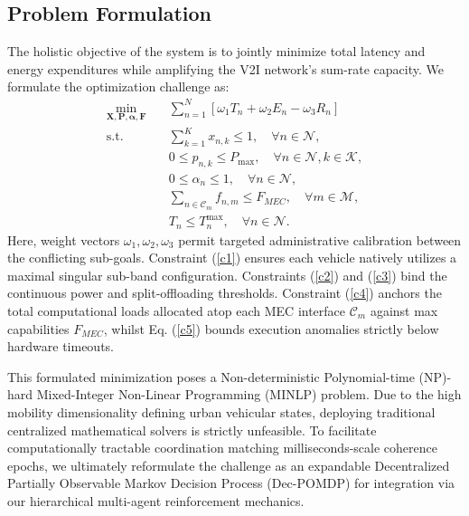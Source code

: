 \subsection{Problem Formulation}
The holistic objective of the system is to jointly minimize total latency and energy expenditures while amplifying the V2I network's sum-rate capacity. We formulate the optimization challenge as:
\begin{align}
    \min_{\mathbf{X}, \mathbf{P}, \boldsymbol{\alpha}, \mathbf{F}} \quad & \sum_{n=1}^N \left[ \omega_1 T_n + \omega_2 E_n - \omega_3 R_n \right] \label{eq:obj} \\
    \text{s.t.} \quad & \sum_{k=1}^K x_{n,k} \leq 1, \quad \forall n \in \mathcal{N}, \label{c1} \\
    & 0 \leq p_{n,k} \leq P_{\max}, \quad \forall n \in \mathcal{N}, k \in \mathcal{K}, \label{c2} \\
    & 0 \leq \alpha_n \leq 1, \quad \forall n \in \mathcal{N}, \label{c3} \\
    & \sum_{n \in \mathcal{C}_m} f_{n,m} \leq F_{MEC}, \quad \forall m \in \mathcal{M}, \label{c4} \\
    & T_n \leq T^{\max}_n, \quad \forall n \in \mathcal{N}. \label{c5}
\end{align}
Here, weight vectors $\omega_1, \omega_2, \omega_3$ permit targeted administrative calibration between the conflicting sub-goals. Constraint (\ref{c1}) ensures each vehicle natively utilizes a maximal singular sub-band configuration. Constraints (\ref{c2}) and (\ref{c3}) bind the continuous power and split-offloading thresholds. Constraint (\ref{c4}) anchors the total computational loads allocated atop each MEC interface $\mathcal{C}_m$ against max capabilities $F_{MEC}$, whilst Eq. (\ref{c5}) bounds execution anomalies strictly below hardware timeouts. 

This formulated minimization poses a Non-deterministic Polynomial-time (NP)-hard Mixed-Integer Non-Linear Programming (MINLP) problem. Due to the high mobility dimensionality defining urban vehicular states, deploying traditional centralized mathematical solvers is strictly unfeasible. To facilitate computationally tractable coordination matching milliseconds-scale coherence epochs, we ultimately reformulate the challenge as an expandable Decentralized Partially Observable Markov Decision Process (Dec-POMDP) for integration via our hierarchical multi-agent reinforcement mechanics.
